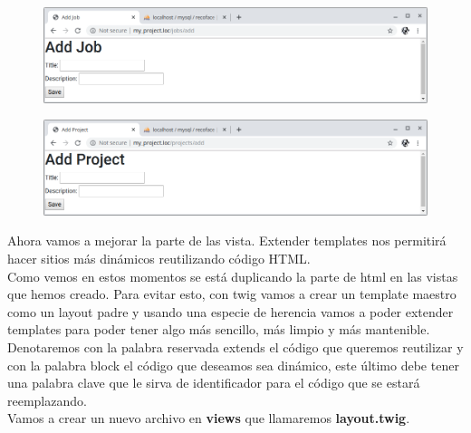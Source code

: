 \documentclass{article}
\begin{document}
\newpage

\begin{figure}[h!]
  \centering
  \includegraphics[scale=0.5]{./Pictures/157_psr7_addjob.png}
\end{figure}

\begin{figure}[h!]
  \centering
  \includegraphics[scale=0.5]{./Pictures/158_psr7_addproject.png}
\end{figure}

Ahora vamos a mejorar la parte de las vista. Extender templates nos permitirá
hacer sitios más dinámicos reutilizando código HTML.\\

Como vemos en estos momentos se está duplicando la parte de html en las vistas
que hemos creado. Para evitar esto, con twig vamos a crear un template maestro
como un layout padre y usando una especie de herencia vamos a poder extender
templates para poder tener algo más sencillo, más limpio y más mantenible.\\

Denotaremos con la palabra reservada extends el código que queremos reutilizar
y con la palabra block el código que deseamos sea dinámico, este último debe
tener una palabra clave que le sirva de identificador para el código que se
estará reemplazando.\\

Vamos a crear un nuevo archivo en \textbf{views} que llamaremos
\textbf{layout.twig}.\\
\end{document}
